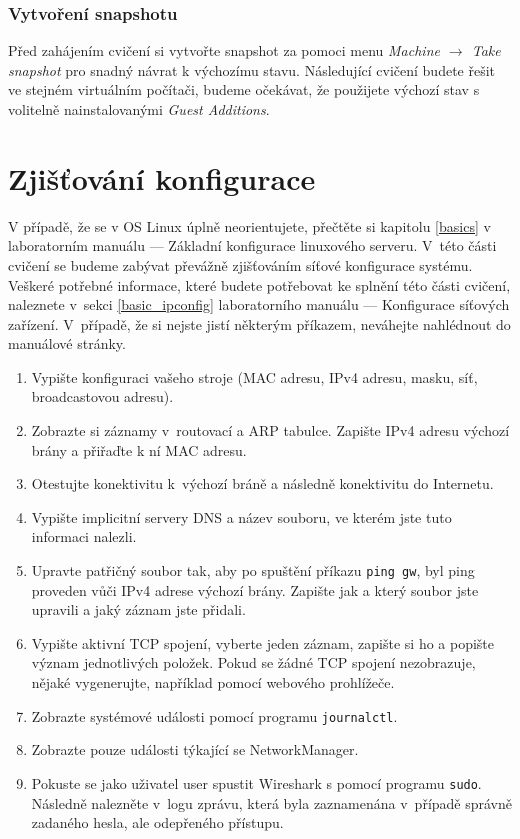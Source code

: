 \subsubsection*{Vytvoření snapshotu}
Před zahájením cvičení si vytvořte snapshot za pomoci menu \textit{Machine
$\rightarrow$ Take snapshot} pro snadný návrat k výchozímu stavu. Následující
cvičení budete řešit ve stejném virtuálním počítači, budeme očekávat, že
použijete výchozí stav s volitelně nainstalovanými \emph{Guest Additions}.

\section{Zjišťování konfigurace}
V případě, že se v OS Linux úplně neorientujete, přečtěte si kapitolu \ref{basics} v
laboratorním manuálu --- Základní konfigurace linuxového serveru. V~této části cvičení se
budeme zabývat převážně zjišťováním síťové konfigurace systému. Veškeré potřebné
informace, které budete potřebovat ke splnění této části cvičení, naleznete
v~sekci \ref{basic_ipconfig} laboratorního manuálu --- Konfigurace síťových zařízení. V~případě, že si nejste jistí některým příkazem, neváhejte nahlédnout do manuálové stránky.

\begin{enumerate}
\item Vypište konfiguraci vašeho stroje (MAC adresu, IPv4 adresu, masku, síť, broadcastovou adresu).
\item Zobrazte si záznamy v~routovací a ARP tabulce. Zapište IPv4 adresu výchozí brány a přiřaďte k ní MAC adresu.
\item Otestujte konektivitu k~výchozí bráně a následně konektivitu do Internetu.
\item Vypište implicitní servery DNS a název souboru, ve kterém jste tuto informaci nalezli.
\item Upravte patřičný soubor tak, aby po spuštění příkazu \texttt{ping gw}, byl ping proveden vůči IPv4 adrese výchozí brány. Zapište jak a který soubor jste upravili a jaký záznam jste přidali.
\item Vypište aktivní TCP spojení, vyberte jeden záznam, zapište si ho a popište význam jednotlivých položek. Pokud se žádné TCP spojení nezobrazuje, nějaké vygenerujte, například pomocí webového prohlížeče.
\item Zobrazte systémové události pomocí programu \texttt{journalctl}.
\item Zobrazte pouze události týkající se NetworkManager.
\item Pokuste se jako uživatel user spustit Wireshark s pomocí programu \texttt{sudo}. Následně nalezněte v~logu zprávu, která byla zaznamenána v~případě správně zadaného hesla, ale odepřeného přístupu.
\end{enumerate}

